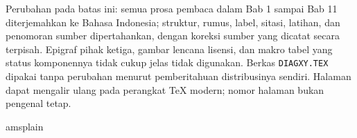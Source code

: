\documentclass[11pt,reqno]{amsbook}
\theoremstyle{definition}
\theoremstyle{remark}
\numberwithin{equation}{section}
\begin{document}
Perubahan pada batas ini: semua prosa pembaca dalam Bab 1 sampai Bab 11
diterjemahkan ke Bahasa Indonesia; struktur, rumus, label, sitasi, latihan,
dan penomoran sumber dipertahankan, dengan koreksi sumber yang dicatat secara
terpisah. Epigraf pihak ketiga, gambar lencana lisensi, dan makro tabel yang
status komponennya tidak cukup jelas tidak digunakan. Berkas
\texttt{DIAGXY.TEX} dipakai tanpa perubahan menurut pemberitahuan distribusinya
sendiri. Halaman dapat
mengalir ulang pada perangkat TeX modern; nomor halaman bukan pengenal tetap.



\vfill\eject

\tableofcontents




\mainmatter




 
 
 
 
 
 
 
 
 
 
 






\backmatter


 \clearpage
  {amsplain}
 


 \cleardoublepage
 \printindex
\end{document}
